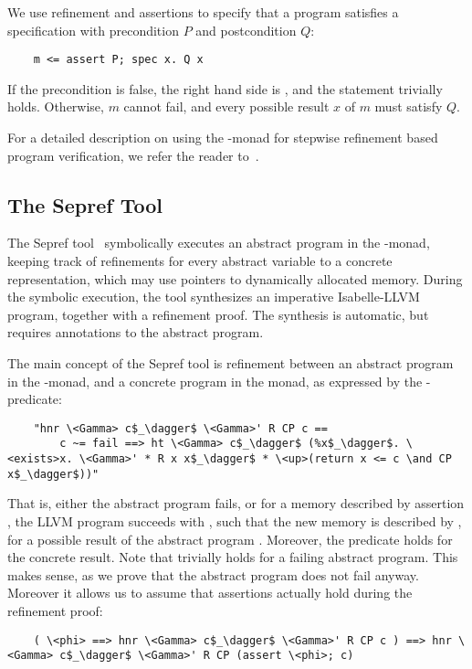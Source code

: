 \documentclass[a4paper,UKenglish,cleveref, autoref, thm-restate]{lipics-v2021}
\begin{document}
  We use refinement and assertions to
  specify that a program  satisfies a specification with precondition \is$P$ and postcondition \is$Q$:
  \begin{lstlisting}
    m <= assert P; spec x. Q x
  \end{lstlisting}
  If the precondition is false, the right hand side is , and the statement trivially holds.
  Otherwise, $m$ cannot fail, and every possible result $x$ of $m$ must satisfy $Q$.

  For a detailed description on using the -monad for stepwise refinement based program verification, we refer the reader to~\cite{LaTu12}.



  \subsection{The Sepref Tool}
  The Sepref tool~\cite{La15,La19-llvm} symbolically executes an abstract program in the -monad,
  keeping track of refinements for every abstract variable to a concrete representation, which may use pointers to dynamically allocated memory.
  During the symbolic execution, the tool synthesizes an imperative Isabelle-LLVM program, together with a refinement proof.
  The synthesis is automatic, but requires annotations to the abstract program.

  The main concept of the Sepref tool is refinement between an abstract program  in the -monad,
  and a concrete program  in the  monad, as expressed by the -predicate:
  \begin{lstlisting}
    "hnr \<Gamma> c$_\dagger$ \<Gamma>' R CP c ==
        c ~= fail ==> ht \<Gamma> c$_\dagger$ (%x$_\dagger$. \<exists>x. \<Gamma>' * R x x$_\dagger$ * \<up>(return x <= c \and CP x$_\dagger$))"
  \end{lstlisting}
  That is, either the abstract program  fails,
  or for a memory described by assertion ,
  the LLVM program  succeeds with ,
  such that the new memory is described by ,
  for a possible result  of the abstract program . Moreover, the predicate  holds for the concrete result.
  Note that  trivially holds for a failing abstract program. This makes sense, as we prove that
  the abstract program does not fail anyway. Moreover it allows us to assume that assertions actually hold during the refinement proof:
  \begin{lstlisting}
    ( \<phi> ==> hnr \<Gamma> c$_\dagger$ \<Gamma>' R CP c ) ==> hnr \<Gamma> c$_\dagger$ \<Gamma>' R CP (assert \<phi>; c)
  \end{lstlisting}
\end{document}

